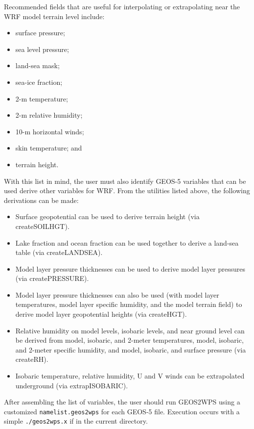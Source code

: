Recommended fields that are useful for interpolating or extrapolating near
the WRF model terrain level include:
\begin{itemize}
\item surface pressure;
\item sea level pressure;
\item land-sea mask;
\item sea-ice fraction;
\item 2-m temperature;
\item 2-m relative humidity;
\item 10-m horizontal winds;
\item skin temperature; and
\item terrain height.
\end{itemize}

With this list in mind, the user must also identify GEOS-5 variables that
can be used derive other variables for WRF. From the utilities listed above,
the following derivations can be made:

\begin{itemize}
\item Surface geopotential can be used to derive terrain height (via 
  createSOILHGT).
\item  Lake fraction and ocean fraction can be used together to derive a 
  land-sea table (via createLANDSEA).
\item Model layer pressure thicknesses can be used to derive model layer 
  pressures (via createPRESSURE).
\item Model layer pressure thicknesses can also be used (with model layer 
  temperatures, model layer specific humidity, and the model terrain field) to
  derive model layer geopotential heights (via createHGT).
\item Relative humidity on model levels, isobaric levels, and near ground level
  can be derived from model, isobaric, and 2-meter temperatures, 
  model, isobaric, and 2-meter specific humidity, and model, isobaric, and
  surface pressure (via createRH).
\item Isobaric temperature, relative humidity, U and V winds can be 
  extrapolated underground (via extrapISOBARIC).
\end{itemize}

After assembling the list of variables, the user should run GEOS2WPS using
a customized \texttt{namelist.geos2wps} for each GEOS-5 file. Execution occurs
with a simple \texttt{./geos2wps.x} if in the current directory.

